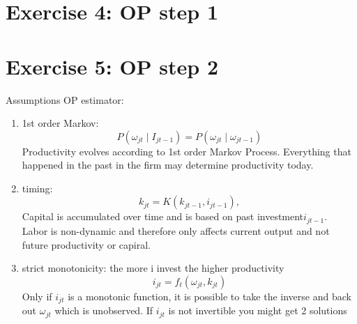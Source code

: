 \documentclass{article}
\begin{document}
\section*{Exercise 4: OP step 1}
\section*{Exercise 5: OP step 2}

Assumptions OP estimator:
\begin{enumerate}
    \item 1st order Markov:
    \[P(\omega_{jt} \mid I_{jt-1}) = P(\omega_{jt} \mid \omega_{jt-1})\]
    Productivity evolves according to 1st order Markov Process. Everything that happened in the past in the firm may determine productivity today.
    \item timing:
    \[k_{jt} = K(k_{jt-1}, i_{jt-1}),\]
    Capital is accumulated over time and is based on past investment$i_{jt-1}$.\\
    Labor is non-dynamic and therefore only affects current output and not future productivity or capiral.
    \item strict monotonicity: the more i invest the higher productivity\\ \[i_{jt} = f_t(\omega_{jt}, k_{jt})\]
    Only if $i_{jt}$ is a monotonic function, it is possible to take the inverse and back out $\omega_{jt}$ which is unobserved. If $i_{jt}$ is not invertible you might get 2 solutions
\end{enumerate}
\end{document}
